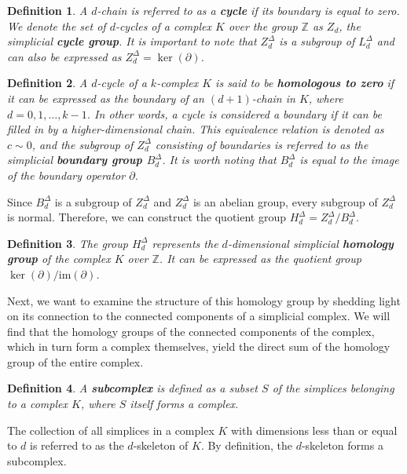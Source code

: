 \documentclass{amsart}
\newtheorem{definition}{Definition}[section]
\begin{document}
\begin{definition}
A $d$-chain is referred to as a \textbf{cycle} if its boundary is equal to zero. We denote the set of $d$-cycles of a complex $K$ over the group $\mathbb{Z}$ as $Z_d$, the simplicial \textbf{cycle group}. It is important to note that $Z^\Delta_d$ is a subgroup of $L^\Delta_d$ and can also be expressed as $Z^\Delta_d = \ker(\partial)$.
\end{definition}

\begin{definition}
A $d$-cycle of a $k$-complex $K$ is said to be \textbf{homologous to zero} if it can be expressed as the boundary of an $(d+1)$-chain in $K$, where $d=0,1,\ldots,k-1$. In other words, a cycle is considered a boundary if it can be \glqq filled in\grqq{} by a higher-dimensional chain. This equivalence relation is denoted as $c \sim 0$, and the subgroup of $Z^\Delta_d$ consisting of boundaries is referred to as the simplicial \textbf{boundary group $B^\Delta_d$}. It is worth noting that $B^\Delta_d$ is equal to the image of the boundary operator $\partial$.
\end{definition}

Since $B^\Delta_d$ is a subgroup of $Z^\Delta_d$ and $Z^\Delta_d$ is an abelian group, every subgroup of $Z^\Delta_d$ is normal. Therefore, we can construct the quotient group $H^\Delta_d = Z^\Delta_d / B^\Delta_d$.

\begin{definition}
The group $H^\Delta_d$ represents the $d$-dimensional simplicial \textbf{homology group} of the complex $K$ over $\mathbb{Z}$. It can be expressed as the quotient group $\ker(\partial) / \text{im}(\partial)$.
\end{definition}

Next, we want to examine the structure of this homology group by shedding light on its connection to the connected components of a simplicial complex. We will find that the homology groups of the connected components of the complex, which in turn form a complex themselves, yield the direct sum of the homology group of the entire complex.

\begin{definition}
A \textbf{subcomplex} is defined as a subset $S$ of the simplices belonging to a complex $K$, where $S$ itself forms a complex.
\end{definition}

The collection of all simplices in a complex $K$ with dimensions less than or equal to $d$ is referred to as the $d$-skeleton of $K$. By definition, the $d$-skeleton forms a subcomplex.
\end{document}
